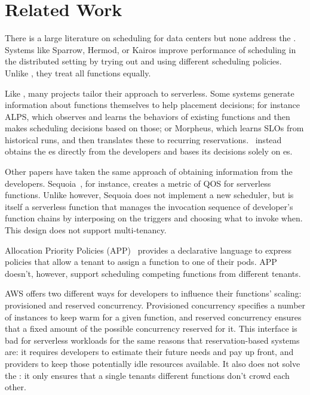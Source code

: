 \section{Related Work}

There is a large literature on scheduling for data centers but none
address the \problem.  Systems like Sparrow\cite{sparrow},
Hermod\cite{hermod}, or Kairos\cite{kairos} improve performance of
scheduling in the distributed setting by trying out and using
different scheduling policies. Unlike \sys{}, they treat all functions
equally.

Like \sys{}, many projects tailor their approach to serverless. Some systems
generate information about functions themselves to help placement decisions; for
instance ALPS\cite{alps}, which observes and learns the behaviors of existing
functions and then makes scheduling decisions based on those; or
Morpheus\cite{morpheus}, which learns SLOs from historical runs, and then
translates these to recurring reservations.~\Sys{} instead obtains the \class{}es
directly from the developers and bases its decisions solely on \class{}es.

Other papers have taken the same approach of obtaining information
from the developers. Sequoia~\cite{sequoia}, for instance, creates a
metric of QOS for serverless functions. Unlike \sys{} however, Sequoia
does not implement a new scheduler, but is itself a serverless
function that manages the invocation sequence of developer's function
chains by interposing on the triggers and choosing what to invoke
when. This design does not support multi-tenancy.

Allocation Priority Policies (APP)~\cite{app-paper} provides a
declarative language to express policies that allow a tenant to assign
a function to one of their pods. APP doesn't, however, support
scheduling competing functions from different tenants.


AWS offers two different ways for developers to influence their functions'
scaling: provisioned and reserved concurrency\cite{aws-scaling}. Provisioned
concurrency specifies a number of instances to keep warm for a given function,
and reserved concurrency ensures that a fixed amount of the possible concurrency
reserved for it. This interface is bad for serverless workloads for the same
reasons that reservation-based systems are: it requires developers to estimate
their future needs and pay up front, and providers to keep those potentially
idle resources available. It also does not solve the \problem{}: it only ensures
that a single tenants different functions don't crowd each other.

